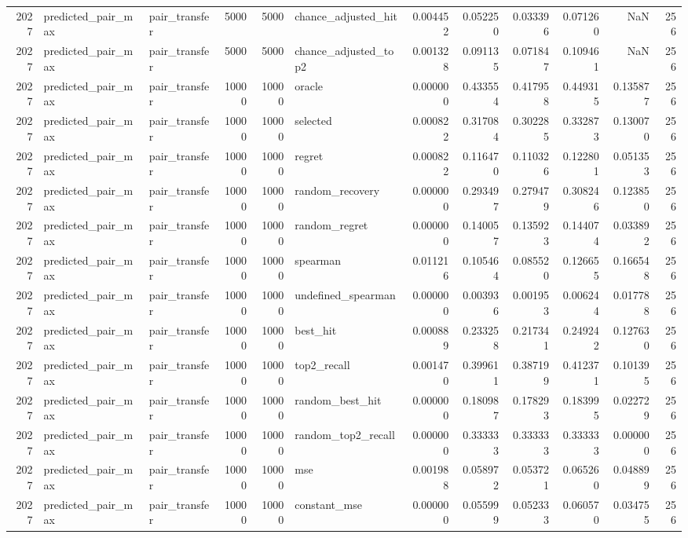 \begin{tabular}{rllrrlrrrrrr}
2027 & predicted_pair_max & pair_transfer & 5000 & 5000 & chance_adjusted_hit & 0.004452 & 0.052250 & 0.033396 & 0.071260 & NaN & 256 \\
2027 & predicted_pair_max & pair_transfer & 5000 & 5000 & chance_adjusted_top2 & 0.001328 & 0.091135 & 0.071847 & 0.109461 & NaN & 256 \\
2027 & predicted_pair_max & pair_transfer & 10000 & 10000 & oracle & 0.000000 & 0.433554 & 0.417958 & 0.449315 & 0.135877 & 256 \\
2027 & predicted_pair_max & pair_transfer & 10000 & 10000 & selected & 0.000822 & 0.317084 & 0.302285 & 0.332873 & 0.130070 & 256 \\
2027 & predicted_pair_max & pair_transfer & 10000 & 10000 & regret & 0.000822 & 0.116470 & 0.110326 & 0.122801 & 0.051353 & 256 \\
2027 & predicted_pair_max & pair_transfer & 10000 & 10000 & random_recovery & 0.000000 & 0.293497 & 0.279479 & 0.308246 & 0.123850 & 256 \\
2027 & predicted_pair_max & pair_transfer & 10000 & 10000 & random_regret & 0.000000 & 0.140057 & 0.135923 & 0.144074 & 0.033892 & 256 \\
2027 & predicted_pair_max & pair_transfer & 10000 & 10000 & spearman & 0.011216 & 0.105464 & 0.085520 & 0.126655 & 0.166548 & 256 \\
2027 & predicted_pair_max & pair_transfer & 10000 & 10000 & undefined_spearman & 0.000000 & 0.003936 & 0.001953 & 0.006244 & 0.017788 & 256 \\
2027 & predicted_pair_max & pair_transfer & 10000 & 10000 & best_hit & 0.000889 & 0.233258 & 0.217341 & 0.249242 & 0.127630 & 256 \\
2027 & predicted_pair_max & pair_transfer & 10000 & 10000 & top2_recall & 0.001470 & 0.399611 & 0.387199 & 0.412371 & 0.101395 & 256 \\
2027 & predicted_pair_max & pair_transfer & 10000 & 10000 & random_best_hit & 0.000000 & 0.180987 & 0.178293 & 0.183995 & 0.022729 & 256 \\
2027 & predicted_pair_max & pair_transfer & 10000 & 10000 & random_top2_recall & 0.000000 & 0.333333 & 0.333333 & 0.333333 & 0.000000 & 256 \\
2027 & predicted_pair_max & pair_transfer & 10000 & 10000 & mse & 0.001988 & 0.058972 & 0.053721 & 0.065260 & 0.048899 & 256 \\
2027 & predicted_pair_max & pair_transfer & 10000 & 10000 & constant_mse & 0.000000 & 0.055999 & 0.052333 & 0.060570 & 0.034755 & 256 \\

\end{tabular}
